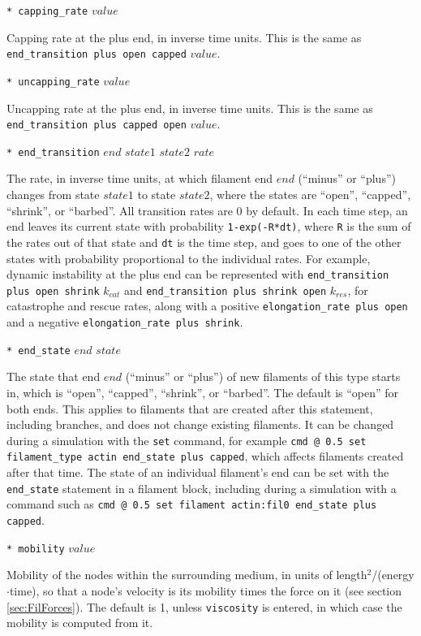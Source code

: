 \documentclass {scrbook}
\newcommand {\ttt} {\texttt}
\begin{document}
\begin{description}
\item{\ttt{* capping\_rate} $value$} %

Capping rate at the plus end, in inverse time units. This is the same as \ttt{end\_transition plus open capped} $value$.

\item{\ttt{* uncapping\_rate} $value$} %

Uncapping rate at the plus end, in inverse time units. This is the same as \ttt{end\_transition plus capped open} $value$.

\item{\ttt{* end\_transition} $end$ $state1$ $state2$ $rate$}

The rate, in inverse time units, at which filament end $end$ (``minus'' or ``plus'') changes from state $state1$ to state $state2$, where the states are ``open'', ``capped'', ``shrink'', or ``barbed''. All transition rates are 0 by default. In each time step, an end leaves its current state with probability \ttt{1-exp(-R*dt)}, where \ttt{R} is the sum of the rates out of that state and \ttt{dt} is the time step, and goes to one of the other states with probability proportional to the individual rates. For example, dynamic instability at the plus end can be represented with \ttt{end\_transition plus open shrink} $k_{cat}$ and \ttt{end\_transition plus shrink open} $k_{res}$, for catastrophe and rescue rates, along with a positive \ttt{elongation\_rate plus open} and a negative \ttt{elongation\_rate plus shrink}.

\item{\ttt{* end\_state} $end$ $state$}

The state that end $end$ (``minus'' or ``plus'') of new filaments of this type starts in, which is ``open'', ``capped'', ``shrink'', or ``barbed''. The default is ``open'' for both ends. This applies to filaments that are created after this statement, including branches, and does not change existing filaments. It can be changed during a simulation with the \ttt{set} command, for example \ttt{cmd @ 0.5 set filament\_type actin end\_state plus capped}, which affects filaments created after that time. The state of an individual filament's end can be set with the \ttt{end\_state} statement in a filament block, including during a simulation with a command such as \ttt{cmd @ 0.5 set filament actin:fil0 end\_state plus capped}.

\item{\ttt{* mobility} $value$}

Mobility of the nodes within the surrounding medium, in units of length$^2$/(energy$\cdot$time), so that a node's velocity is its mobility times the force on it (see section \ref{sec:FilForces}). The default is 1, unless \ttt{viscosity} is entered, in which case the mobility is computed from it.


\end{description}
\end{document}
